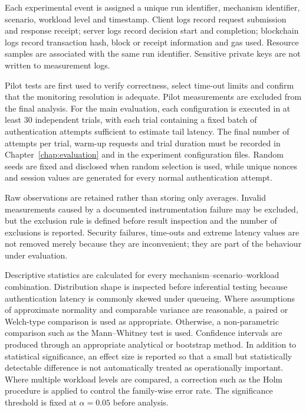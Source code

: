 Each experimental event is assigned a unique run identifier, mechanism identifier, scenario, workload level and timestamp. Client logs record request submission and response receipt; server logs record decision start and completion; blockchain logs record transaction hash, block or receipt information and gas used. Resource samples are associated with the same run identifier. Sensitive private keys are not written to measurement logs.

Pilot tests are first used to verify correctness, select time-out limits and confirm that the monitoring resolution is adequate. Pilot measurements are excluded from the final analysis. For the main evaluation, each configuration is executed in at least 30 independent trials, with each trial containing a fixed batch of authentication attempts sufficient to estimate tail latency. The final number of attempts per trial, warm-up requests and trial duration must be recorded in Chapter~\ref{chap:evaluation} and in the experiment configuration files. Random seeds are fixed and disclosed when random selection is used, while unique nonces and session values are generated for every normal authentication attempt.

Raw observations are retained rather than storing only averages. Invalid measurements caused by a documented instrumentation failure may be excluded, but the exclusion rule is defined before result inspection and the number of exclusions is reported. Security failures, time-outs and extreme latency values are not removed merely because they are inconvenient; they are part of the behaviour under evaluation.

Descriptive statistics are calculated for every mechanism--scenario--workload combination. Distribution shape is inspected before inferential testing because authentication latency is commonly skewed under queueing. Where assumptions of approximate normality and comparable variance are reasonable, a paired or Welch-type comparison is used as appropriate. Otherwise, a non-parametric comparison such as the Mann--Whitney test is used\cite{MannWhitney1947}. Confidence intervals are produced through an appropriate analytical or bootstrap method\cite{EfronTibshirani1993}. In addition to statistical significance, an effect size is reported so that a small but statistically detectable difference is not automatically treated as operationally important. Where multiple workload levels are compared, a correction such as the Holm procedure is applied to control the family-wise error rate. The significance threshold is fixed at $\alpha = 0.05$ before analysis\cite{Holm1979}.

